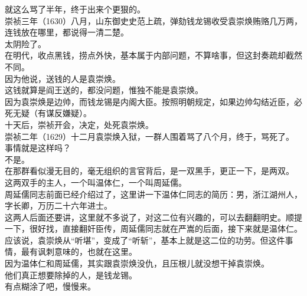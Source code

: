 \begin{multicols}{\theparacolNo}
就这么骂了半年，终于出来个更狠的。\\

崇祯三年（1630）八月，山东御史史范上疏，弹劾钱龙锡收受袁崇焕贿赂几万两，连钱放在哪里，都说得一清二楚。\\

太阴险了。\\

在明代，收点黑钱，捞点外快，基本属于内部问题，不算啥事，但这封奏疏却截然不同。\\

因为他说，送钱的人是袁崇焕。\\

这钱就算是阎王送的，都没问题，惟独不能是袁崇焕。\\

因为袁崇焕是边帅，而钱龙锡是内阁大臣。按照明朝规定，如果边帅勾结近臣，必死无疑（有谋反嫌疑）。\\

十天后，崇祯开会，决定，处死袁崇焕。\\

崇祯二年（1629）十二月袁崇焕入狱，一群人围着骂了八个月，终于，骂死了。\\

事情就是这样吗？\\

不是。\\

在那群看似漫无目的，毫无组织的言官背后，是一双黑手，更正一下，是两双。\\

这两双手的主人，一个叫温体仁，一个叫周延儒。\\

周延儒同志前面已经介绍过了，这里讲一下温体仁同志的简历：男，浙江湖州人，字长卿，万历二十六年进士。\\

这两人后面还要讲，这里就不多说了，对这二位有兴趣的，可以去翻翻明史。顺提一下，很好找，直接翻奸臣传，周延儒同志就在严嵩的后面，接下来就是温体仁。\\

应该说，袁崇焕从“听堪”，变成了“听斩”，基本上就是这二位的功劳。但这件事情，最有讽刺意味的，也就在这里。\\

因为温体仁和周延儒，其实跟袁崇焕没仇，且压根儿就没想干掉袁崇焕。\\

他们真正想要除掉的人，是钱龙锡。\\

有点糊涂了吧，慢慢来。\\


\end{multicols}
